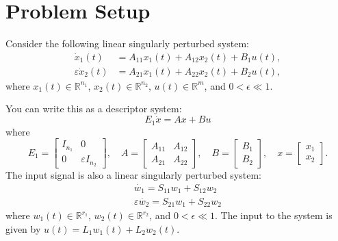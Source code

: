 \documentclass{article}
\begin{document}
\section{Problem Setup}
\label{sec:problem-setup}
Consider the following linear singularly perturbed system:
\begin{equation}
\begin{aligned}
\dot{x}_1(t) &= A_{11} x_1(t) + A_{12} x_2(t) + B_1 u(t), \\
\varepsilon \dot{x}_2(t) &= A_{21} x_1(t) + A_{22} x_2(t) + B_2 u(t),
\end{aligned}
\end{equation}
where \(x_1(t) \in \mathbb{R}^{n_1}\), \(x_2(t) \in \mathbb{R}^{n_2}\), \(u(t) \in \mathbb{R}^m\), and \(0 < \epsilon \ll 1\).

You can write this as a descriptor system: 
\begin{equation}
    E_1 \dot{x} = A x + B u
\end{equation}
where
\begin{equation}
    E_1 = \begin{bmatrix}
    I_{n_1} & 0 \\
    0 & \varepsilon I_{n_2}
    \end{bmatrix}, \quad
    A = \begin{bmatrix}
    A_{11} & A_{12} \\
    A_{21} & A_{22}
    \end{bmatrix}, \quad
    B = \begin{bmatrix}
    B_1 \\
    B_2
    \end{bmatrix}, \quad
    x = \begin{bmatrix}
    x_1 \\
    x_2
    \end{bmatrix}.
\end{equation}
The input signal is also a linear singularly perturbed system: 
\begin{equation}
\begin{aligned}
\dot{w_1} = S_{11} w_1 + S_{12}w_2 \\
\varepsilon \dot{w_2} = S_{21} w_1 + S_{22} w_2
\end{aligned}
\end{equation}
where \(w_1(t) \in \mathbb{R}^{r_1}\), \(w_2(t) \in \mathbb{R}^{r_2}\), and \(0 < \epsilon \ll 1\). 
The input to the system is given by \(u(t) = L_1 w_1(t) + L_2 w_2(t)\).
\end{document}
